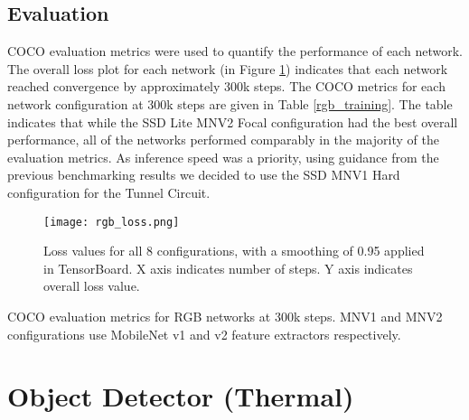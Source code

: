\subsection{Evaluation}

COCO evaluation metrics were used to quantify the performance of each network. The overall loss plot for each network (in Figure \ref{rgb_loss}) indicates that each network reached convergence by approximately 300k steps. The COCO metrics for each network configuration at 300k steps are given in Table \ref{rgb_training}. The table indicates that while the SSD Lite MNV2 Focal configuration had the best overall performance, all of the networks performed comparably in the majority of the evaluation metrics. As inference speed was a priority, using guidance from the previous benchmarking results we decided to use the SSD MNV1 Hard configuration for the Tunnel Circuit.

\begin{figure}	
	\centering
	\texttt{[image: rgb\_loss.png]}
	\caption[RGB network loss values]{Loss values for all 8 configurations, with a smoothing of 0.95 applied in TensorBoard. X axis indicates number of steps. Y axis indicates overall loss value.}
	\label{rgb_loss}
\end{figure}

\begin{table}
	\centering
	\begin{adjustbox}{max width=.95\textwidth}
	\end{adjustbox}
	\caption[COCO evaluation metrics for RGB networks at 300k steps]{COCO evaluation metrics for RGB networks at 300k steps. MNV1 and MNV2 configurations use MobileNet v1 and v2 feature extractors respectively.}
	\label{rgb_training}
\end{table}

\section{Object Detector (Thermal)}


